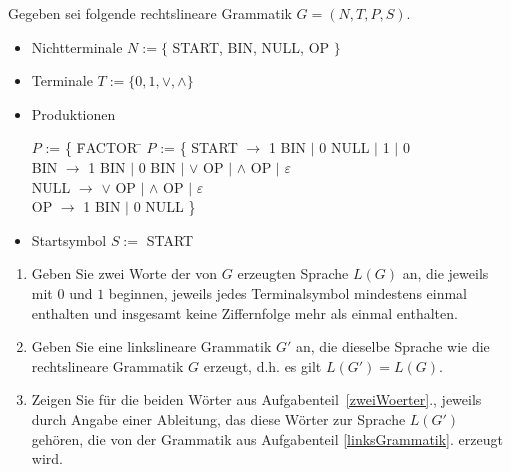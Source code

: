 \documentclass{uebungsblatt}
\begin{document}
\begin{aufgabe}
\medskip
Gegeben sei folgende rechtslineare Grammatik $G = (N,T,P,S)$.
\begin{itemize}
\item
Nichtterminale
$N := \{$ START, BIN, NULL, OP $\}$
\item
Terminale
$T := \{0, 1, \vee, \wedge\}$
\item
Produktionen 
\begin{tabbing}
$P$ := \{ \quad \= FACTOR \quad \= \kill
$P$ := \{ \> START  \>$\rightarrow$ 1 BIN $|$ 0 NULL $|$ 1 $|$ 0  \\
          \> BIN    \>$\rightarrow$ 1 BIN $|$ 0 BIN $|$ $\vee$ OP $|$ $\wedge$ OP $|$ $\varepsilon$ \\
          \> NULL   \>$\rightarrow$ $\vee$ OP $|$ $\wedge$ OP $|$ $\varepsilon$ \\
          \> OP     \>$\rightarrow$ 1 BIN $|$ 0 NULL \quad \}
\end{tabbing}
\item
Startsymbol $S :=$ START
\end{itemize}

\begin{enumerate}
\item
\label{zweiWoerter}
Geben Sie zwei Worte der von $G$ erzeugten Sprache $L(G)$ an, 
die jeweils mit $0$ und $1$ beginnen,
jeweils jedes Terminalsymbol mindestens einmal enthalten und
insgesamt keine Ziffernfolge mehr als einmal enthalten.\\
\item
\label{linksGrammatik}
Geben Sie eine linkslineare Grammatik $G'$ an, 
die dieselbe Sprache wie die rechtslineare Grammatik $G$
erzeugt, d.h. es gilt $L(G') = L(G)$.\\
\item
Zeigen Sie für die beiden Wörter aus Aufgabenteil~\ref{zweiWoerter}., jeweils
durch Angabe einer Ableitung, das diese Wörter zur Sprache $L(G')$ gehören, die
von der Grammatik aus Aufgabenteil \ref{linksGrammatik}. erzeugt wird.\\

\end{enumerate}
\end{aufgabe}
\begin{loesung}

\end{loesung}
\end{document}
